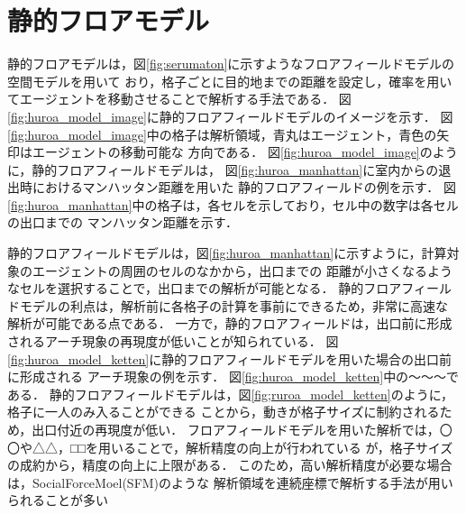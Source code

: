 \section{静的フロアモデル}
静的フロアモデルは，図\ref{fig:serumaton}に示すようなフロアフィールドモデルの空間モデルを用いて
おり，格子ごとに目的地までの距離を設定し，確率を用いてエージェントを移動させることで解析する手法である．
図\ref{fig:huroa_model_image}に静的フロアフィールドモデルのイメージを示す．
図\ref{fig:huroa_model_image}中の格子は解析領域，青丸はエージェント，青色の矢印はエージェントの移動可能な
方向である．
図\ref{fig:huroa_model_image}のように，静的フロアフィールドモデルは，
図\ref{fig:huroa_manhattan}に室内からの退出時におけるマンハッタン距離を用いた
静的フロアフィールドの例を示す．
図\ref{fig:huroa_manhattan}中の格子は，各セルを示しており，セル中の数字は各セルの出口までの
マンハッタン距離を示す．



静的フロアフィールドモデルは，図\ref{fig:huroa_manhattan}に示すように，計算対象のエージェントの周囲のセルのなかから，出口までの
距離が小さくなるようなセルを選択することで，出口までの解析が可能となる．
静的フロアフィールドモデルの利点は，解析前に各格子の計算を事前にできるため，非常に高速な
解析が可能である点である．
一方で，静的フロアフィールドは，出口前に形成されるアーチ現象の再現度が低いことが知られている．
図\ref{fig:huroa_model_ketten}に静的フロアフィールドモデルを用いた場合の出口前に形成される
アーチ現象の例を示す．
図\ref{fig:huroa_model_ketten}中の～～～である．
静的フロアフィールドモデルは，図\ref{fig;ruroa_model_ketten}のように，格子に一人のみ入ることができる
ことから，動きが格子サイズに制約されるため，出口付近の再現度が低い．
フロアフィールドモデルを用いた解析では，〇〇や△△，□□を用いることで，解析精度の向上が行われている
が，格子サイズの成約から，精度の向上に上限がある．
このため，高い解析精度が必要な場合は，SocialForceMoel(SFM)のような
解析領域を連続座標で解析する手法が用いられることが多い

